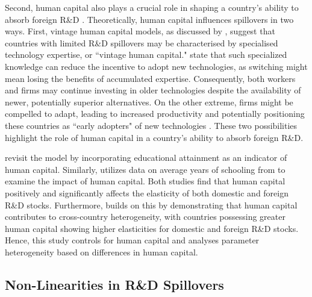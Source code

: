 \documentclass[12pt]{article}
\begin{document}
Second, human capital also plays a crucial role in shaping a country's ability to absorb foreign R\&D \citep{Nelson1966}. Theoretically, human capital influences spillovers in two ways. First, vintage human capital models, as discussed by \citet{Chari1991}, suggest that countries with limited R\&D spillovers may be characterised by specialised technology expertise, or ``vintage human capital." \citet{Jovanovic1996} state that such specialized knowledge can reduce the incentive to adopt new technologies, as switching might mean losing the benefits of accumulated expertise. Consequently, both workers and firms may continue investing in older technologies despite the availability of newer, potentially superior alternatives. On the other extreme, firms might be compelled to adapt, leading to increased productivity and potentially positioning these countries as ``early adopters" of new technologies \citep{Barro1997}. These two possibilities highlight the role of human capital in a country's ability to absorb foreign R\&D. 

\citet{Coe1997} revisit the \citet{Coe1995} model by incorporating educational attainment as an indicator of human capital. Similarly, \citet{Engelbrecht1997} utilizes data on average years of schooling from \citet{Barro2001} to examine the impact of human capital. Both studies find that human capital positively and significantly affects the elasticity of both domestic and foreign R\&D stocks. Furthermore, \citet{Coe2009} builds on this by demonstrating that human capital contributes to cross-country heterogeneity, with countries possessing greater human capital showing higher elasticities for domestic and foreign R\&D stocks. Hence, this study controls for human capital and analyses parameter heterogeneity based on differences in human capital. 

\subsection{Non-Linearities in R\&D Spillovers}
\end{document}
